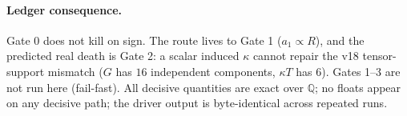 \documentclass[11pt]{article}
\newcommand{\QQ}{\mathbb{Q}}
\begin{document}
\paragraph{Ledger consequence.} Gate 0 does not kill on sign. The route lives to Gate 1
($a_1\propto R$), and the predicted real death is Gate 2: a scalar induced $\kappa$
cannot repair the v18 tensor-support mismatch ($G$ has $16$ independent components,
$\kappa T$ has $6$). Gates 1--3 are not run here (fail-fast). All decisive quantities
are exact over $\QQ$; no floats appear on any decisive path; the driver output is
byte-identical across repeated runs.
\end{document}
